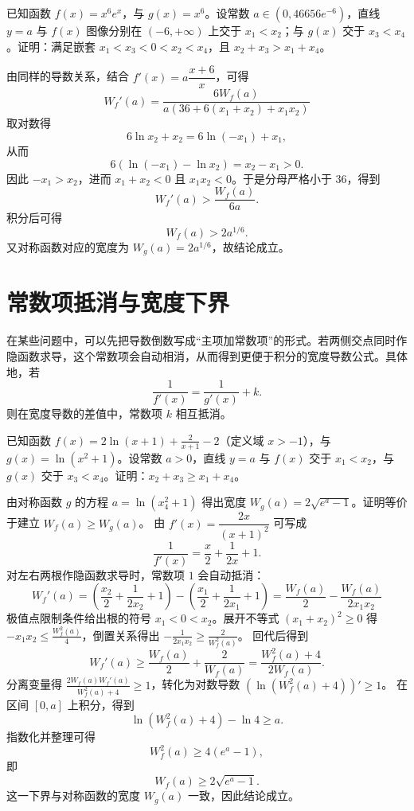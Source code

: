 \begin{example}
已知函数 $f(x) = x^6 e^x$，与 $g(x) = x^6$。设常数 $a \in (0, 46656e^{-6})$，直线 $y=a$ 与 $f(x)$ 图像分别在 $(-6, +\infty)$ 上交于 $x_1 < x_2$；与 $g(x)$ 交于 $x_3 < x_4$。证明：满足嵌套 $x_1 < x_3 < 0 < x_2 < x_4$，且 $x_2+x_3 > x_1+x_4$。
\end{example}

\begin{solution}
由同样的导数关系，结合 $f'(x) = a \dfrac{x+6}{x}$，可得
$$ W_f'(a) = \frac{6 W_f(a)}{a(36 + 6(x_1+x_2) + x_1 x_2)} $$
取对数得
\[
6\ln x_2 + x_2 = 6\ln(-x_1) + x_1,
\]
从而
\[
6(\ln(-x_1) - \ln x_2) = x_2 - x_1 > 0.
\]
因此 $-x_1 > x_2$，进而 $x_1+x_2<0$ 且 $x_1x_2<0$。于是分母严格小于 $36$，得到
\[
W_f'(a) > \frac{W_f(a)}{6a}.
\]
积分后可得
\[
W_f(a) > 2a^{1/6}.
\]
又对称函数对应的宽度为 $W_g(a) = 2a^{1/6}$，故结论成立。
\end{solution}

\section{常数项抵消与宽度下界}

在某些问题中，可以先把导数倒数写成“主项加常数项”的形式。若两侧交点同时作隐函数求导，这个常数项会自动相消，从而得到更便于积分的宽度导数公式。具体地，若
\[
\frac{1}{f'(x)} = \frac{1}{g'(x)} + k.
\]
则在宽度导数的差值中，常数项 \(k\) 相互抵消。

\begin{example}
已知函数 $f(x) = 2\ln(x+1) + \frac{2}{x+1} - 2$（定义域 $x>-1$），与 $g(x) = \ln(x^2+1)$。设常数 $a > 0$，直线 $y=a$ 与 $f(x)$ 交于 $x_1 < x_2$，与 $g(x)$ 交于 $x_3 < x_4$。证明：$x_2 + x_3 \ge x_1 + x_4$。
\end{example}

\begin{solution}
由对称函数 $g$ 的方程 $a = \ln(x_4^2+1)$ 得出宽度 $W_g(a) = 2\sqrt{e^a-1}$。证明等价于建立 $W_f(a) \ge W_g(a)$。
由 $f'(x) = \dfrac{2x}{(x+1)^2}$ 可写成
\[
\frac{1}{f'(x)} = \frac{x}{2} + \frac{1}{2x} + 1.
\]
对左右两根作隐函数求导时，常数项 \(1\) 会自动抵消：
$$ W_f'(a) = \left(\frac{x_2}{2} + \frac{1}{2x_2} + 1\right) - \left(\frac{x_1}{2} + \frac{1}{2x_1} + 1\right) = \frac{W_f(a)}{2} - \frac{W_f(a)}{2x_1 x_2} $$
极值点限制条件给出根的符号 $x_1 < 0 < x_2$。展开不等式 $(x_1+x_2)^2 \ge 0$ 得 $-x_1 x_2 \le \frac{W_f^2(a)}{4}$，倒置关系得出 $-\frac{1}{2x_1 x_2} \ge \frac{2}{W_f^2(a)}$。
回代后得到
\[
W_f'(a) \ge \frac{W_f(a)}{2} + \frac{2}{W_f(a)} = \frac{W_f^2(a)+4}{2W_f(a)}.
\]
分离变量得 $\frac{2W_f(a) W_f'(a)}{W_f^2(a)+4} \ge 1$，转化为对数导数 $\left(\ln(W_f^2(a)+4)\right)' \ge 1$。
在区间 \([0,a]\) 上积分，得到
\[
\ln(W_f^2(a)+4) - \ln 4 \ge a.
\]
指数化并整理可得
\[
W_f^2(a) \ge 4(e^a-1),
\]
即
\[
W_f(a) \ge 2\sqrt{e^a-1}.
\]
这一下界与对称函数的宽度 \(W_g(a)\) 一致，因此结论成立。
\end{solution}


